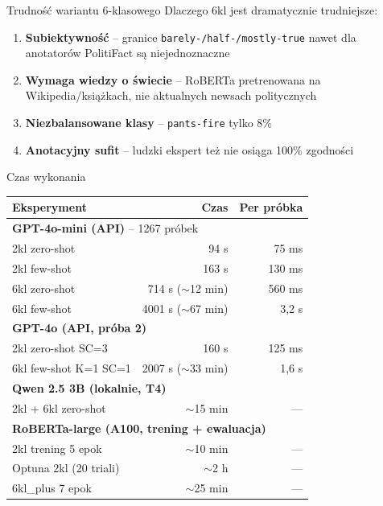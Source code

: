 \documentclass[10pt]{beamer}
\begin{document}
\begin{frame}{Trudność wariantu 6-klasowego}
  Dlaczego 6kl jest dramatycznie trudniejsze:
  \begin{enumerate}
    \item \textbf{Subiektywność} -- granice \texttt{barely-/half-/mostly-true}
          nawet dla anotatorów PolitiFact są niejednoznaczne
    \item \textbf{Wymaga wiedzy o świecie} -- RoBERTa pretrenowana
          na Wikipedia/książkach, nie aktualnych newsach politycznych
    \item \textbf{Niezbalansowane klasy} -- \texttt{pants-fire} tylko 8\%
    \item \textbf{Anotacyjny sufit} -- ludzki ekspert też nie osiąga 100\% zgodności
  \end{enumerate}
\end{frame}

\begin{frame}{Czas wykonania}
  \small
  \begin{center}
  \begin{tabular}{lrr}
    \toprule
    Eksperyment & Czas & Per próbka \\
    \midrule
    \multicolumn{3}{l}{\textbf{GPT-4o-mini (API)} -- 1267 próbek} \\
    2kl zero-shot           & 94 s     & 75 ms \\
    2kl few-shot            & 163 s    & 130 ms \\
    6kl zero-shot           & 714 s ($\sim$12 min) & 560 ms \\
    6kl few-shot            & 4001 s ($\sim$67 min) & 3{,}2 s \\
    \midrule
    \multicolumn{3}{l}{\textbf{GPT-4o (API, próba 2)}} \\
    2kl zero-shot SC=3      & 160 s    & 125 ms \\
    6kl few-shot K=1 SC=1   & 2007 s ($\sim$33 min) & 1{,}6 s \\
    \midrule
    \multicolumn{3}{l}{\textbf{Qwen 2.5 3B (lokalnie, T4)}} \\
    2kl + 6kl zero-shot     & $\sim$15 min & --- \\
    \midrule
    \multicolumn{3}{l}{\textbf{RoBERTa-large (A100, trening + ewaluacja)}} \\
    2kl trening 5 epok      & $\sim$10 min & --- \\
    Optuna 2kl (20 triali)  & $\sim$2 h    & --- \\
    6kl\_plus 7 epok        & $\sim$25 min & --- \\
    \bottomrule
  \end{tabular}
  \end{center}
\end{frame}
\end{document}
